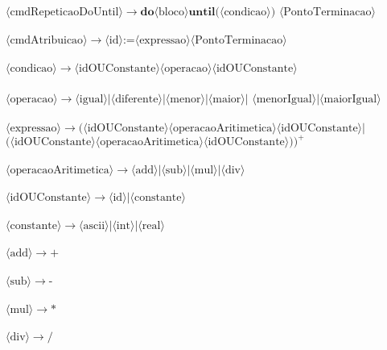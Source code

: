\documentclass[11pt]{article}
\begin{document}
$\langle\text{cmdRepeticaoDoUntil}\rangle \rightarrow \textbf{do} \langle\text{bloco}\rangle \textbf{until(} \langle\text{condicao}\rangle \textbf{)}$
$\langle\text{PontoTerminacao}\rangle$\\\\
$\langle\text{cmdAtribuicao}\rangle \rightarrow  \langle\text{id}\rangle \textbf{:=} \langle\text{expressao}\rangle \langle\text{PontoTerminacao}\rangle $\\\\
$\langle\text{condicao}\rangle \rightarrow  \langle\text{idOUConstante}\rangle \langle\text{operacao}\rangle \langle\text{idOUConstante}\rangle$\\\\
$\langle\text{operacao}\rangle \rightarrow  \langle\text{igual}\rangle | \langle\text{diferente}\rangle | \langle\text{menor}\rangle | \langle\text{maior}\rangle | $
$ \langle\text{menorIgual}\rangle |\langle\text{maiorIgual}\rangle$\\\\
$\langle\text{expressao}\rangle \rightarrow  (\langle\text{idOUConstante}\rangle \langle\text{operacaoAritimetica}\rangle \langle\text{idOUConstante}\rangle|$\\
$\textbf{(} \langle\text{idOUConstante}\rangle \langle\text{operacaoAritimetica}\rangle \langle\text{idOUConstante}\rangle \textbf{)})^{+}$\\\\
$\langle\text{operacaoAritimetica}\rangle \rightarrow \langle\text{add}\rangle|\langle\text{sub}\rangle|\langle\text{mul}\rangle|\langle\text{div}\rangle$\\\\
$\langle\text{idOUConstante}\rangle \rightarrow  \langle\text{id}\rangle| \langle\text{constante}\rangle$\\\\
$\langle\text{constante}\rangle \rightarrow \langle\text{ascii}\rangle| \langle\text{int}\rangle|\langle\text{real}\rangle$\\\\
$\langle\text{add}\rangle \rightarrow   \textbf{+}$\\\\
$\langle\text{sub}\rangle \rightarrow   \textbf{-}$\\\\
$\langle\text{mul}\rangle \rightarrow   \textbf{*}$\\\\
$\langle\text{div}\rangle \rightarrow   \textbf{/}$\\\\
\end{document}

